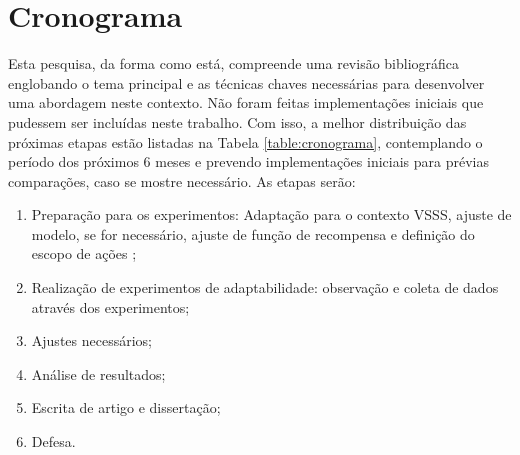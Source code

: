 










\section{Cronograma}
\label{sec:cronograma} 

Esta pesquisa, da forma como está, compreende uma revisão bibliográfica englobando o tema principal e as técnicas chaves necessárias para desenvolver uma abordagem neste contexto. Não foram feitas implementações iniciais que pudessem ser incluídas neste trabalho. Com isso, a melhor distribuição das próximas etapas estão listadas na Tabela \ref{table:cronograma}, contemplando o período dos próximos 6 meses e prevendo implementações iniciais para prévias comparações, caso se mostre necessário. As etapas serão:

\begin{enumerate}
    \item Preparação para os experimentos: Adaptação para o contexto VSSS, ajuste de modelo, se for necessário, ajuste de função de recompensa e definição do escopo de ações \cite{11_selecao_acoes};
    
    \item Realização de experimentos de adaptabilidade: observação e coleta de dados através dos experimentos;
    
    \item Ajustes necessários;
    
    \item Análise de resultados;
    
    \item Escrita de artigo e dissertação;
    
    \item Defesa.
\end{enumerate}


